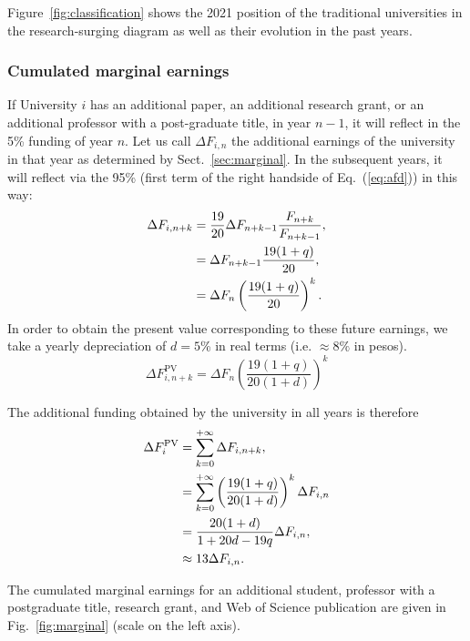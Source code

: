 \documentclass[twocolumn]{article}
\def\eqref#1{Eq.~(\ref{eq:#1})}
\begin{document}
Figure~\ref{fig:classification} shows the 2021 position of the traditional universities in the research-surging diagram as well as their evolution in the past years.

\subsubsection{Cumulated marginal earnings}

If University $i$ has an additional paper, an additional research grant, or an additional professor with a post-graduate title, in year $n - 1$, it will reflect in the 5\% funding of year $n$. Let us call $\Delta F_{i,n}$ the additional earnings  of the university in that year as determined by Sect.~\ref{sec:marginal}.  In the subsequent years, it will reflect via the 95\% (first term of the right handside of \eqref{afd}) in this way:
\begin{align}
   \Delta F_{i,n+k} &=  \frac{19}{20} \Delta F_{n+k-1} 
                                \frac{F_{n+k}}{F_{n+k-1}}, \notag\\
                    &= \Delta F_{n+k-1}  \frac{ 19 (1 + q)} { 20}\notag,\\
                    &= \Delta F_{n} \left(\frac{ 19(1+q)} {20} \right) ^{k}.
\end{align}
In order to obtain the present value  corresponding to these future earnings, we take a yearly depreciation of $d = 5$\% in real terms (i.e. $\approx 8\%$ in pesos).  
\begin{equation}
    \Delta F_{i,n+k}^\text{PV} = \Delta F_{n}    
                \left(\frac{ 19(1+q)} {20(1+d)} \right) ^{k}
\end{equation}

The additional funding obtained by the university in all years is therefore
\begin{align}
    \Delta F_{i}^\text{PV}
         &= \sum_{k=0}^{+\infty} \Delta F_{i,n+k}, \notag \\
         &= \sum_{k=0}^{+\infty} \left(
                        \frac{19(1 + q)}{20(1 + d)}  \right)^k\Delta F_{i,n} \notag \\
                 &= \frac{20(1+d)}{1 + 20d - 19q} \Delta F_{i,n}, \\
                 &\approx 13 \Delta F_{i,n}. \notag
\end{align}

The cumulated marginal earnings for an additional student, professor with a postgraduate title, research grant, and Web of Science publication are given in Fig.~\ref{fig:marginal} (scale on the left axis).
\end{document}
